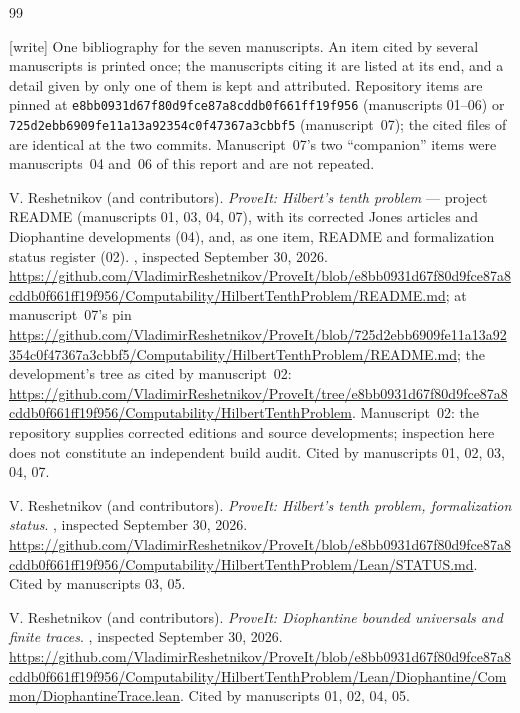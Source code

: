 \documentclass[11pt,a4paper]{article}
\theoremstyle{definition}
\theoremstyle{remark}
\newcommand{\wtag}{\textup{[write]}}%
\begin{document}
\clearpage
{}
{}
\begin{thebibliography}{99}
\small
\raggedright
\item[] \wtag{} One bibliography for the seven manuscripts. An item cited by several manuscripts is printed once; the manuscripts citing it are listed at its end, and a detail given by only one of them is kept and attributed. Repository items are pinned at \texttt{e8bb0931d67f80d9fce87a8cddb0f661ff19f956} (manuscripts 01--06) or \texttt{725d2ebb6909fe11a13a92354c0f47367a3cbbf5} (manuscript~07); the cited files of  are identical at the two commits. Manuscript~07's two ``companion'' items were manuscripts~04 and~06 of this report and are not repeated.

V. Reshetnikov (and contributors).
\emph{ProveIt: Hilbert's tenth problem} --- project README (manuscripts 01, 03, 04, 07), with its corrected Jones articles and Diophantine developments (04), and, as one item, README and formalization status register (02).
, inspected September 30, 2026.
\url{https://github.com/VladimirReshetnikov/ProveIt/blob/e8bb0931d67f80d9fce87a8cddb0f661ff19f956/Computability/HilbertTenthProblem/README.md};
at manuscript~07's pin \url{https://github.com/VladimirReshetnikov/ProveIt/blob/725d2ebb6909fe11a13a92354c0f47367a3cbbf5/Computability/HilbertTenthProblem/README.md};
the development's tree as cited by manuscript~02:
\url{https://github.com/VladimirReshetnikov/ProveIt/tree/e8bb0931d67f80d9fce87a8cddb0f661ff19f956/Computability/HilbertTenthProblem}.
Manuscript~02: the repository supplies corrected editions and source developments; inspection here does not constitute an independent build audit.
Cited by manuscripts 01, 02, 03, 04, 07.

V. Reshetnikov (and contributors).
\emph{ProveIt: Hilbert's tenth problem, formalization status}.
, inspected September 30, 2026.
\url{https://github.com/VladimirReshetnikov/ProveIt/blob/e8bb0931d67f80d9fce87a8cddb0f661ff19f956/Computability/HilbertTenthProblem/Lean/STATUS.md}.
Cited by manuscripts 03, 05.

V. Reshetnikov (and contributors).
\emph{ProveIt: Diophantine bounded universals and finite traces}.
, inspected September 30, 2026.
\url{https://github.com/VladimirReshetnikov/ProveIt/blob/e8bb0931d67f80d9fce87a8cddb0f661ff19f956/Computability/HilbertTenthProblem/Lean/Diophantine/Common/DiophantineTrace.lean}.
Cited by manuscripts 01, 02, 04, 05.


\end{thebibliography}
\end{document}
